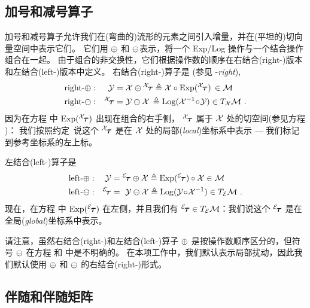 \subsection{加号和减号算子}

加号和减号算子允许我们在(弯曲的)流形的元素之间引入增量，并在(平坦的)切向量空间中表示它们。 
它们用 $\oplus$ 和 $\ominus$表示，将一个 Exp/Log 操作与一个结合操作组合在一起。
由于组合的非交换性，它们根据操作数的顺序在右结合(right-)版本和左结合(left-)版本中定义。
右结合(right-)算子是 (参见 -\emph{right}), 
%
\begin{align}
\textrm{right-}\oplus:&& \mathcal{Y} &= \mathcal{X}\oplus{^{\mathcal{X}}\!{\bm \tau}} \triangleq \mathcal{X}\circ\operatorname*{Exp}({^{\mathcal{X}}\!{\bm \tau}}) \,\in \mathcal{M} \label{equ:rplus} \\
\textrm{right-}\ominus:&& {^{\mathcal{X}}\!{\bm \tau}} &= \mathcal{Y}\ominus\mathcal{X} \,\triangleq \operatorname*{Log}(\mathcal{X}^{-1}\!\circ\!\mathcal{Y})\in T_{\mathcal{X}}{\mathcal{M}} \label{equ:rminus}
~.
\end{align}
%
因为在方程  中 $\operatorname*{Exp}({^{\mathcal{X}}\!{\bm \tau}})$ 出现在组合的右手侧，
${^{\mathcal{X}}\!{\bm \tau}}$ 属于 $\mathcal{X}$ 处的切空间(参见方程 )： 
我们按照约定\footnotemark~说这个 ${^{\mathcal{X}}\!{\bm \tau}}$ 是在 $\mathcal{X}$ 处的局部(\emph{local})坐标系中表示 ---  我们标记到参考坐标系的左上标。

左结合(left-)算子是
\begin{align}
\textrm{left-}\oplus:&&\mathcal{Y}&={^{\mathcal{E}}\!{\bm \tau}}\oplus\mathcal{X} \triangleq \operatorname*{Exp}({^{\mathcal{E}}\!{\bm \tau}})\circ\mathcal{X} \in \mathcal{M} \label{equ:lplus} \\
\textrm{left-}\ominus:&&{^{\mathcal{E}}\!{\bm \tau}}&=~\mathcal{Y}\ominus\mathcal{X} \triangleq \operatorname*{Log}(\mathcal{Y}\!\circ\!\mathcal{X}^{-1})\in T_{\mathcal{E}}{\mathcal{M}}
\label{equ:lminus}
~.
\end{align}
%
现在，在方程  中 $\operatorname*{Exp}({^{\mathcal{E}}\!{\bm \tau}})$ 在左侧，并且我们有 ${{^{\mathcal{E}}\!{\bm \tau}}\in T_{\mathcal{E}}{\mathcal{M}}}$：我们说这个 ${{^{\mathcal{E}}}\!{\bm \tau}}$ 是在全局(\emph{global})坐标系中表示。

请注意，虽然右结合(right-)和左结合(left-)算子 $\oplus$ 是按操作数顺序区分的，但符号 $\ominus$ 在方程  和  中是不明确的。
在本项工作中，我们默认表示局部扰动，因此我们默认使用 $\oplus$ 和 $\ominus$ 的右结合(right-)形式。


\subsection[Adjoint, and adjoint matrix]{伴随和伴随矩阵}
\label{sec:adjoint}

